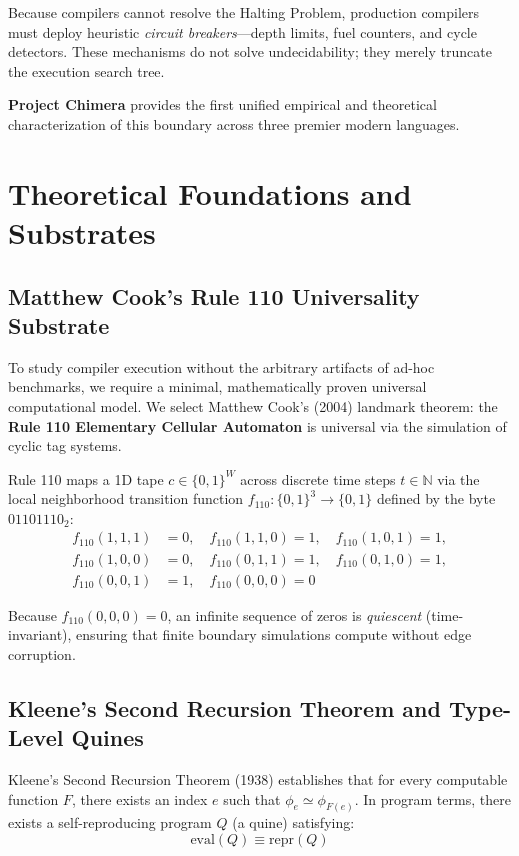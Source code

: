 \documentclass[10pt,journal,compsoc]{IEEEtran}
\begin{document}
Because compilers cannot resolve the Halting Problem, production compilers must deploy heuristic \emph{circuit breakers}—depth limits, fuel counters, and cycle detectors. These mechanisms do not solve undecidability; they merely truncate the execution search tree.

\textbf{Project Chimera} provides the first unified empirical and theoretical characterization of this boundary across three premier modern languages.

\section{Theoretical Foundations and Substrates}

\subsection{Matthew Cook's Rule 110 Universality Substrate}
To study compiler execution without the arbitrary artifacts of ad-hoc benchmarks, we require a minimal, mathematically proven universal computational model. We select Matthew Cook's (2004) landmark theorem: the \textbf{Rule 110 Elementary Cellular Automaton} is universal via the simulation of cyclic tag systems.

Rule 110 maps a 1D tape $c \in \{0, 1\}^W$ across discrete time steps $t \in \mathbb{N}$ via the local neighborhood transition function $f_{110}: \{0, 1\}^3 \to \{0, 1\}$ defined by the byte $01101110_2$:
\begin{align}
f_{110}(1, 1, 1) &= 0, \quad f_{110}(1, 1, 0) = 1, \quad f_{110}(1, 0, 1) = 1, \nonumber \\
f_{110}(1, 0, 0) &= 0, \quad f_{110}(0, 1, 1) = 1, \quad f_{110}(0, 1, 0) = 1, \nonumber \\
f_{110}(0, 0, 1) &= 1, \quad f_{110}(0, 0, 0) = 0
\end{align}

Because $f_{110}(0, 0, 0) = 0$, an infinite sequence of zeros is \emph{quiescent} (time-invariant), ensuring that finite boundary simulations compute without edge corruption.

\subsection{Kleene's Second Recursion Theorem and Type-Level Quines}
Kleene's Second Recursion Theorem (1938) establishes that for every computable function $F$, there exists an index $e$ such that $\phi_e \simeq \phi_{F(e)}$. In program terms, there exists a self-reproducing program $Q$ (a quine) satisfying:
\begin{equation}
\text{eval}(Q) \equiv \text{repr}(Q)
\end{equation}
\end{document}

